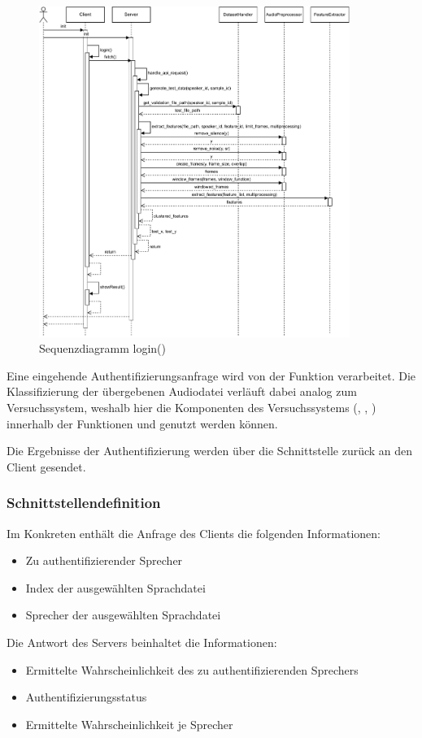 \begin{figure}[H]
    \centering
    \includegraphics[width=0.9\textwidth, keepaspectratio]{images/SequenzdiagrammClientServer}
    \caption{Sequenzdiagramm login()}
    \label{fig:SequenceHandleApiRequest}
\end{figure}

Eine eingehende Authentifizierungsanfrage wird von der Funktion  verarbeitet.
Die Klassifizierung der übergebenen Audiodatei verläuft dabei analog zum Versuchssystem, weshalb hier die Komponenten des Versuchssystems (, , ) innerhalb der Funktionen  und  genutzt werden können. %

Die Ergebnisse der Authentifizierung werden über die Schnittstelle zurück an den Client gesendet.

\subsubsection{Schnittstellendefinition}
Im Konkreten enthält die Anfrage des Clients die folgenden Informationen:
\begin{itemize}
    \item Zu authentifizierender Sprecher
    \item Index der ausgewählten Sprachdatei
    \item Sprecher der ausgewählten Sprachdatei
\end{itemize}
Die Antwort des Servers beinhaltet die Informationen:
\begin{itemize}
    \item Ermittelte Wahrscheinlichkeit des zu authentifizierenden Sprechers
    \item Authentifizierungsstatus
    \item Ermittelte Wahrscheinlichkeit je Sprecher
\end{itemize}
